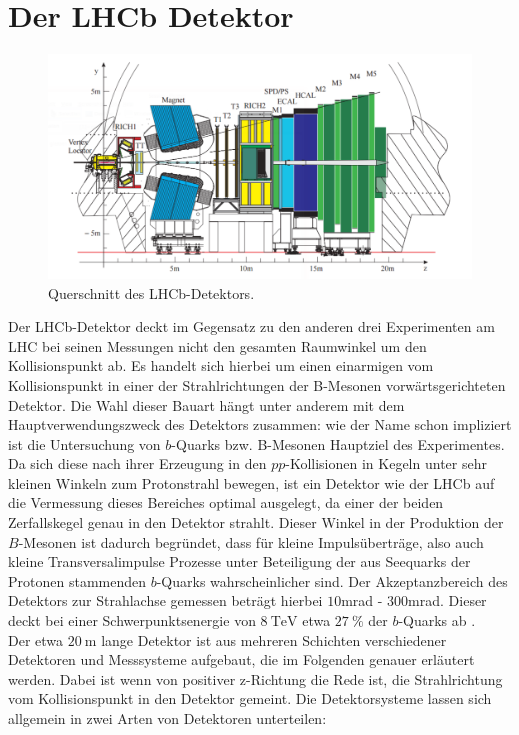 \section{Der LHCb Detektor}
%
\begin{figure}[H]
  \centering
      \includegraphics[width=\textwidth]{Plots/lhcb.pdf}
  \caption{Querschnitt des LHCb-Detektors\cite{lhcb}.}
  \label{fig:lhcb}
\end{figure}
%
Der LHCb-Detektor deckt im Gegensatz zu den anderen drei Experimenten am LHC bei seinen Messungen nicht den gesamten Raumwinkel um den Kollisionspunkt ab. Es handelt sich hierbei um einen einarmigen vom Kollisionspunkt in einer der Strahlrichtungen der B-Mesonen vorwärtsgerichteten Detektor. Die Wahl dieser Bauart hängt unter anderem mit dem Hauptverwendungszweck des Detektors zusammen: wie der Name schon impliziert ist die Untersuchung von $b$-Quarks bzw. B-Mesonen Hauptziel des Experimentes. Da sich diese nach ihrer Erzeugung in den $pp$-Kollisionen in Kegeln unter sehr kleinen Winkeln zum Protonstrahl bewegen, ist ein Detektor wie der LHCb auf die Vermessung dieses Bereiches optimal ausgelegt, da einer der beiden Zerfallskegel genau in den Detektor strahlt. Dieser Winkel in der Produktion der $B$-Mesonen ist dadurch begründet, dass für kleine Impulsüberträge, also auch kleine Transversalimpulse Prozesse unter Beteiligung der aus Seequarks der Protonen stammenden $b$-Quarks wahrscheinlicher sind. Der Akzeptanzbereich des Detektors zur Strahlachse gemessen beträgt hierbei $10$mrad - $300$mrad. Dieser deckt bei einer Schwerpunktsenergie von $\SI{8}{\tera\electronvolt}$ etwa $\SI{27}{\percent}$ der $b$-Quarks ab \cite{rad}.\\
%
Der etwa $\SI{20}{\meter}$ lange Detektor ist aus mehreren Schichten verschiedener Detektoren und Messsysteme aufgebaut, die im Folgenden genauer erläutert werden. Dabei ist wenn von positiver z-Richtung die Rede ist, die Strahlrichtung vom Kollisionspunkt in den Detektor gemeint. Die Detektorsysteme lassen sich allgemein in zwei Arten von Detektoren unterteilen:
